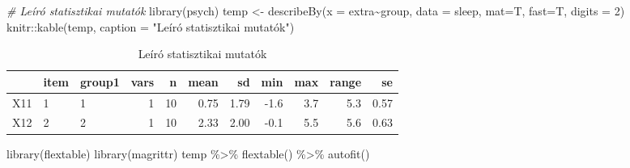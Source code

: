 \documentclass[
]{book}
\newenvironment{Shaded}{\begin{snugshade}}{\end{snugshade}}
\newcommand{\AttributeTok}[1]{\textcolor[rgb]{0.77,0.63,0.00}{#1}}
\newcommand{\CommentTok}[1]{\textcolor[rgb]{0.56,0.35,0.01}{\textit{#1}}}
\newcommand{\DecValTok}[1]{\textcolor[rgb]{0.00,0.00,0.81}{#1}}
\newcommand{\FunctionTok}[1]{\textcolor[rgb]{0.00,0.00,0.00}{#1}}
\newcommand{\NormalTok}[1]{#1}
\newcommand{\OtherTok}[1]{\textcolor[rgb]{0.56,0.35,0.01}{#1}}
\newcommand{\SpecialCharTok}[1]{\textcolor[rgb]{0.00,0.00,0.00}{#1}}
\newcommand{\StringTok}[1]{\textcolor[rgb]{0.31,0.60,0.02}{#1}}
\begin{document}
\begin{Shaded}
\begin{Highlighting}[]
\CommentTok{\# Leíró statisztikai mutatók}
\FunctionTok{library}\NormalTok{(psych)}
\NormalTok{temp }\OtherTok{\textless{}{-}} \FunctionTok{describeBy}\NormalTok{(}\AttributeTok{x =}\NormalTok{ extra}\SpecialCharTok{\textasciitilde{}}\NormalTok{group, }\AttributeTok{data =}\NormalTok{ sleep, }\AttributeTok{mat=}\NormalTok{T, }\AttributeTok{fast=}\NormalTok{T, }\AttributeTok{digits =} \DecValTok{2}\NormalTok{)}
\NormalTok{knitr}\SpecialCharTok{::}\FunctionTok{kable}\NormalTok{(temp, }\AttributeTok{caption =} \StringTok{"Leíró statisztikai mutatók"}\NormalTok{)}
\end{Highlighting}
\end{Shaded}

\begin{table}

\caption{\label{tab:unnamed-chunk-6}Leíró statisztikai mutatók}
\centering
\begin{tabular}[t]{l|l|l|r|r|r|r|r|r|r|r}
\hline
  & item & group1 & vars & n & mean & sd & min & max & range & se\\
\hline
X11 & 1 & 1 & 1 & 10 & 0.75 & 1.79 & -1.6 & 3.7 & 5.3 & 0.57\\
\hline
X12 & 2 & 2 & 1 & 10 & 2.33 & 2.00 & -0.1 & 5.5 & 5.6 & 0.63\\
\hline
\end{tabular}
\end{table}

\begin{Shaded}
\begin{Highlighting}[]

\FunctionTok{library}\NormalTok{(flextable)}
\FunctionTok{library}\NormalTok{(magrittr)}
\NormalTok{temp }\SpecialCharTok{\%\textgreater{}\%} \FunctionTok{flextable}\NormalTok{() }\SpecialCharTok{\%\textgreater{}\%} \FunctionTok{autofit}\NormalTok{()}
\end{Highlighting}
\end{Shaded}

\providecommand{\docline}[3]{\noalign{\global\setlength{\arrayrulewidth}{#1}}\arrayrulecolor[HTML]{#2}\cline{#3}}

\setlength{\tabcolsep}{2pt}

\renewcommand*{\arraystretch}{1.5}
\end{document}

